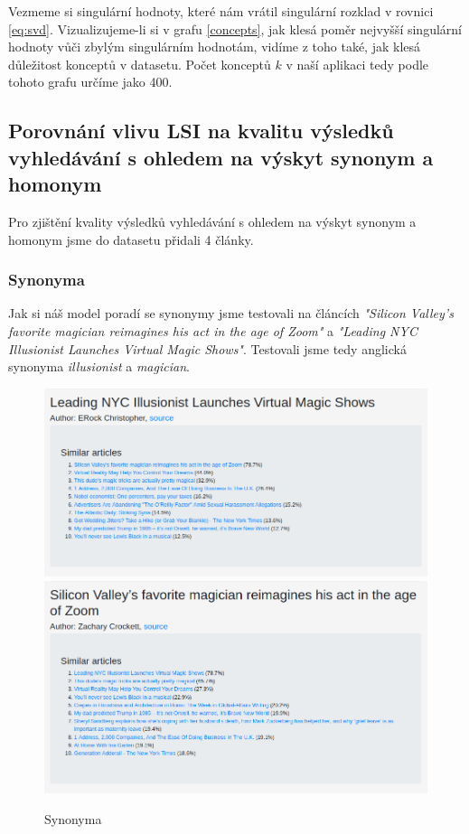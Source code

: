 \documentclass[11pt]{scrartcl} %
\begin{document}
Vezmeme si singulární hodnoty, které nám vrátil singulární rozklad v rovnici \ref{eq:svd}. Vizualizujeme-li si v grafu \ref{concepts}, jak klesá poměr nejvyšší singulární hodnoty vůči zbylým singulárním hodnotám, vidíme z toho také, jak klesá důležitost konceptů v datasetu. Počet konceptů $k$ v naší aplikaci tedy podle tohoto grafu určíme jako 400.

\subsection{Porovnání vlivu LSI na kvalitu výsledků vyhledávání s ohledem na výskyt synonym a homonym}

Pro zjištění kvality výsledků vyhledávání s ohledem na výskyt synonym a homonym jsme do datasetu přidali 4 články.

\subsubsection{Synonyma}

Jak si náš model poradí se synonymy jsme testovali na článcích \emph{"Silicon Valley’s favorite magician reimagines his act in the age of Zoom"} a \emph{"Leading NYC Illusionist Launches Virtual Magic Shows"}. Testovali jsme tedy anglická synonyma \emph{illusionist} a \emph{magician}.

\begin{figure}[h] %
	\centering
	\includegraphics[width=0.7\columnwidth]{images/synonyms_0.png}
	\includegraphics[width=0.7\columnwidth]{images/synonyms_1.png}
	\caption{Synonyma}
	\label{synonyms}
\end{figure}
\end{document}
